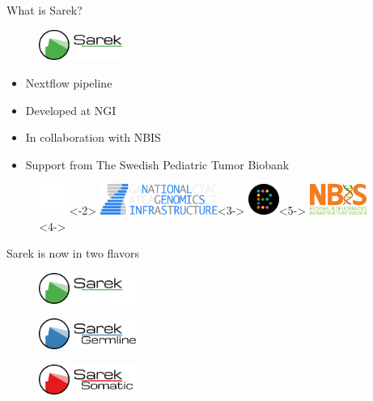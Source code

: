 \documentclass{beamer}
\begin{document}
\begin{frame}{What is Sarek?}
	\begin{figure}[t]
		\includegraphics[height=1cm]{pictures/Sarek_no_border}
	\end{figure}
	\begin{itemize}
		\pause
		\item Nextflow pipeline
		\item<3-> Developed at NGI
		\item<4-> In collaboration with NBIS
		\item<5-> Support from The Swedish Pediatric Tumor Biobank
	\end{itemize}
	\begin{figure}
		\includegraphics[height=1cm]{pictures/blank}<-2>
		\includegraphics[height=1cm]{pictures/NGI}<3->
		\only<3->{\hfill}
		\includegraphics[height=1cm]{pictures/Barntumorbanken}<5->
		\only<4->{\hfill}
		\includegraphics[height=1cm]{pictures/NBIS}<4->
	\end{figure}
	\vfill
\end{frame}

\begin{frame}{Sarek is now in two flavors}
	\begin{figure}
		\includegraphics[height=1cm]{pictures/Sarek}
	\end{figure}
	\pause
	\begin{figure}
		\includegraphics[height=1cm]{pictures/Sarek_germline}
	\end{figure}
	\begin{figure}
		\includegraphics[height=1cm]{pictures/Sarek_somatic}
	\end{figure}
\end{frame}
\end{document}
